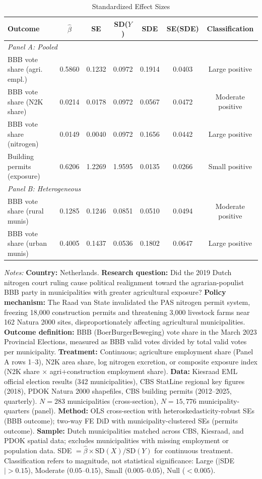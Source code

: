 \begin{table}[htbp]
\centering
\caption{Standardized Effect Sizes}
\label{tab:sde}
\setlength{\tabcolsep}{4pt}
\footnotesize
\begin{threeparttable}
\begin{tabular}{lcccccc}
\toprule
Outcome & $\hat{\beta}$ & SE & SD($Y$) & SDE & SE(SDE) & Classification \\
\midrule
\multicolumn{8}{l}{\textit{Panel A: Pooled}} \\
BBB vote share (agri. empl.) & 0.5860 & 0.1232 & 0.0972 & 0.1914 & 0.0403 & Large positive \\
BBB vote share (N2K share) & 0.0214 & 0.0178 & 0.0972 & 0.0567 & 0.0472 & Moderate positive \\
BBB vote share (nitrogen) & 0.0149 & 0.0040 & 0.0972 & 0.1656 & 0.0442 & Large positive \\
Building permits (exposure) & 0.6206 & 1.2269 & 1.9595 & 0.0135 & 0.0266 & Small positive \\
\midrule
\multicolumn{8}{l}{\textit{Panel B: Heterogeneous}} \\
BBB vote share (rural munis) & 0.1285 & 0.1246 & 0.0851 & 0.0510 & 0.0494 & Moderate positive \\
BBB vote share (urban munis) & 0.4005 & 0.1437 & 0.0536 & 0.1802 & 0.0647 & Large positive \\
\bottomrule
\end{tabular}
\begin{tablenotes}[flushleft]\small
\item \textit{Notes:} \textbf{Country:} Netherlands. \textbf{Research question:} Did the 2019 Dutch nitrogen court ruling cause political realignment toward the agrarian-populist BBB party in municipalities with greater agricultural exposure? \textbf{Policy mechanism:} The Raad van State invalidated the PAS nitrogen permit system, freezing 18,000 construction permits and threatening 3,000 livestock farms near 162 Natura 2000 sites, disproportionately affecting agricultural municipalities. \textbf{Outcome definition:} BBB (BoerBurgerBeweging) vote share in the March 2023 Provincial Elections, measured as BBB valid votes divided by total valid votes per municipality. \textbf{Treatment:} Continuous; agriculture employment share (Panel A rows 1--3), N2K area share, log nitrogen excretion, or composite exposure index (N2K share $\times$ agri+construction employment share). \textbf{Data:} Kiesraad EML official election results (342 municipalities), CBS StatLine regional key figures (2018), PDOK Natura 2000 shapefiles, CBS building permits (2012--2025, quarterly). $N = 283$ municipalities (cross-section), $N = 15{,}776$ municipality-quarters (panel). \textbf{Method:} OLS cross-section with heteroskedasticity-robust SEs (BBB outcome); two-way FE DiD with municipality-clustered SEs (permits outcome). \textbf{Sample:} Dutch municipalities matched across CBS, Kiesraad, and PDOK spatial data; excludes municipalities with missing employment or population data. SDE $= \hat{\beta} \times \text{SD}(X) / \text{SD}(Y)$ for continuous treatment. Classification refers to magnitude, not statistical significance: Large ($|$SDE$| > 0.15$), Moderate ($0.05$--$0.15$), Small ($0.005$--$0.05$), Null ($< 0.005$).

\end{tablenotes}
\end{threeparttable}
\end{table}
